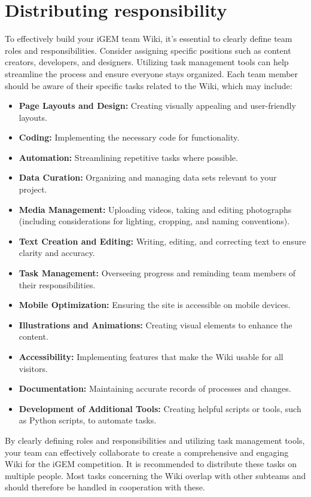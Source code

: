    \section{Distributing responsibility} \label{sec:distributing-responsibility}
    To effectively build your iGEM team Wiki, it’s essential to clearly define team roles and responsibilities.
    Consider assigning specific positions such as content creators, developers, and designers.
    Utilizing task management tools can help streamline the process and ensure everyone stays organized.
    Each team member should be aware of their specific tasks related to the Wiki, which may include:
    \begin{itemize}
        \item \textbf{Page Layouts and Design:} Creating visually appealing and user-friendly layouts.
        \item \textbf{Coding:} Implementing the necessary code for functionality.
        \item \textbf{Automation:} Streamlining repetitive tasks where possible.
        \item \textbf{Data Curation:} Organizing and managing data sets relevant to your project.
        \item \textbf{Media Management:} Uploading videos, taking and editing photographs (including considerations for lighting, cropping, and naming conventions).
        \item \textbf{Text Creation and Editing:} Writing, editing, and correcting text to ensure clarity and accuracy.
        \item \textbf{Task Management:} Overseeing progress and reminding team members of their responsibilities.
        \item \textbf{Mobile Optimization:} Ensuring the site is accessible on mobile devices.
        \item \textbf{Illustrations and Animations:} Creating visual elements to enhance the content.
        \item \textbf{Accessibility:} Implementing features that make the Wiki usable for all visitors.
        \item \textbf{Documentation:} Maintaining accurate records of processes and changes.
        \item \textbf{Development of Additional Tools:} Creating helpful scripts or tools, such as Python scripts, to automate tasks.
    \end{itemize}
    By clearly defining roles and responsibilities and utilizing task management tools, your team can effectively collaborate to create a comprehensive and engaging Wiki for the iGEM competition.
    It is recommended to distribute these tasks on multiple people. \newline
    Most tasks concerning the Wiki overlap with other subteams and should therefore be handled in cooperation with these.

